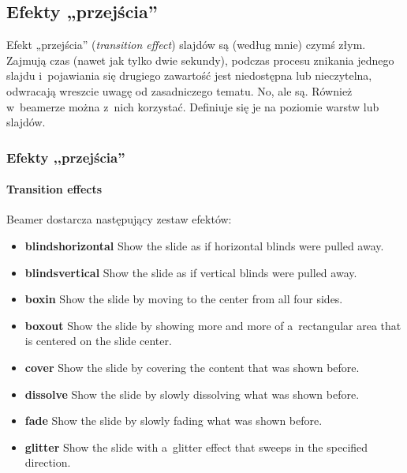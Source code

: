\subsection{Efekty „przejścia”}

Efekt „przejścia” (\emph{transition effect}) slajdów są (według mnie) czymś złym.
Zajmują czas (nawet jak tylko dwie sekundy), podczas procesu znikania jednego slajdu i~pojawiania się drugiego zawartość jest niedostępna lub nieczytelna, odwracają wreszcie uwagę od zasadniczego tematu.
No, ale są.
Również w~beamerze można z~nich korzystać. Definiuje się je na poziomie warstw lub slajdów.

\begin{frame}
 \frametitle<presentation>{Efekty ,,przejścia''}
 \framesubtitle{Transition effects}
 \hypertarget{efekty}{Beamer} dostarcza następujący zestaw efektów:
 \begin{itemize}
  \item<2>
        \textbf{blindshorizontal}
        Show the slide as if horizontal blinds were pulled away.
  \item<3>
        \textbf{blindsvertical}
        Show the slide as if vertical blinds were pulled away.
  \item<4>
        \textbf{boxin}
        Show the slide by moving to the center from all four sides.
  \item<5>
        \textbf{boxout}
        Show the slide by showing more and more of a~rectangular area that is centered on the slide center.
  \item<6>
        \textbf{cover}
        Show the slide by covering the content that was shown before.
  \item<7>
        \textbf{dissolve}
        Show the slide by slowly dissolving what was shown before.
  \item<8>
        \textbf{fade}
        Show the slide by slowly fading what was shown before.
  \item<9>
        \textbf{glitter}
        Show the slide with a~glitter effect that sweeps in the specified direction.
 \end{itemize}
\end{frame}
